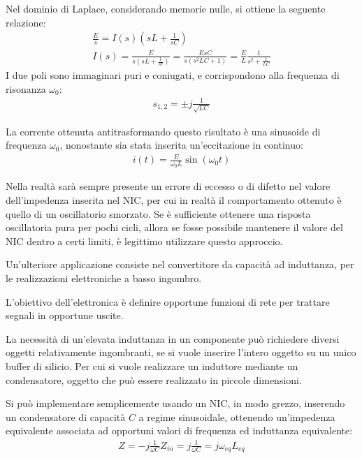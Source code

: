 \documentclass{article}
\numberwithin{equation}{subsection}
\begin{document}
Nel dominio di Laplace, considerando memorie nulle, si ottiene la seguente relazione:
\begin{gather*}
    \displaystyle\frac{E}{s}=I(s)\left(sL+\frac{1}{sC}\right)\\
    I(s)=\displaystyle\frac{E}{s\left(sL+\displaystyle\frac{1}{sc}\right)}=\frac{EsC}{s\left(s^2LC+1\right)}=\frac{E}{L}\frac{1}{s^2+\displaystyle\frac{1}{LC}}
\end{gather*}
I due poli sono immaginari puri e coniugati, e corrispondono alla frequenza di risonanza $\omega_0$:
\begin{gather*}
    s_{1,2}=\pm j\displaystyle\frac{1}{\sqrt {LC}}
\end{gather*}

La corrente ottenuta antitrasformando questo risultato è una sinusoide di frequenza $\omega_0$, nonostante sia stata inserita un'eccitazione in 
continuo:
\begin{gather*}
    i(t)=\displaystyle\frac{E}{\omega_0L}\sin(\omega_0t)
\end{gather*}

Nella realtà sarà sempre presente un errore di eccesso o di difetto nel valore dell'impedenza inserita nel NIC, per cui in realtà il comportamento 
ottenuto è quello di un oscillatorio smorzato. Se è sufficiente ottenere una risposta oscillatoria pura per pochi cicli, allora se fosse 
possibile mantenere il valore del NIC dentro a certi limiti, è legittimo utilizzare questo approccio. 


Un'ulteriore applicazione consiste nel convertitore da capacità ad induttanza, per le realizzazioni elettroniche a basso ingombro. 

L'obiettivo dell'elettronica è definire opportune funzioni di rete per trattare segnali in opportune uscite. 

La necessità di un'elevata induttanza in un componente può richiedere diversi oggetti relativamente ingombranti, se si vuole 
inserire l'intero oggetto su un unico buffer di silicio. Per cui si vuole realizzare un induttore mediante un condensatore, oggetto che può 
essere realizzato in piccole dimensioni. 

Si può implementare semplicemente usando un NIC, in modo grezzo, inserendo un condensatore di capacità $C$ a regime sinusoidale, ottenendo un'impedenza 
equivalente associata ad opportuni valori di frequenza ed induttanza equivalente:
\begin{gather*}
    Z=\displaystyle-j\frac{1}{\omega C}
    Z_{in}=\displaystyle j\frac{1}{\omega C}=j\omega_{eq}L_{eq}
\end{gather*}
\end{document}

